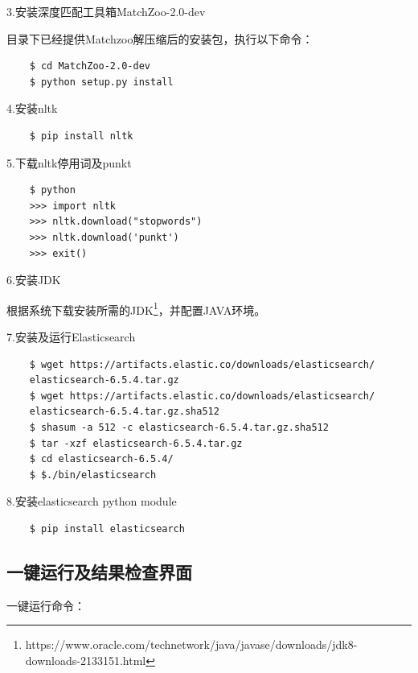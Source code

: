\documentclass[a4paper]{article}
\begin{document}
3.安装深度匹配工具箱MatchZoo-2.0-dev

目录下已经提供Matchzoo解压缩后的安装包，执行以下命令：
\begin{verbatim}
    $ cd MatchZoo-2.0-dev
    $ python setup.py install
\end{verbatim}

4.安装nltk
\begin{verbatim}
    $ pip install nltk
\end{verbatim}

5.下载nltk停用词及punkt
\begin{verbatim}
    $ python
    >>> import nltk
    >>> nltk.download("stopwords")
    >>> nltk.download('punkt')
    >>> exit()
\end{verbatim}

6.安装JDK

根据系统下载安装所需的JDK\footnote{https://www.oracle.com/technetwork/java/javase/downloads/jdk8-downloads-2133151.html}，并配置JAVA环境。

7.安装及运行Elasticsearch
\begin{verbatim}
    $ wget https://artifacts.elastic.co/downloads/elasticsearch/
    elasticsearch-6.5.4.tar.gz
    $ wget https://artifacts.elastic.co/downloads/elasticsearch/
    elasticsearch-6.5.4.tar.gz.sha512
    $ shasum -a 512 -c elasticsearch-6.5.4.tar.gz.sha512
    $ tar -xzf elasticsearch-6.5.4.tar.gz
    $ cd elasticsearch-6.5.4/
    $ $./bin/elasticsearch
\end{verbatim}

8.安装elasticsearch python module
\begin{verbatim}
    $ pip install elasticsearch
\end{verbatim}

\subsection{一键运行及结果检查界面}
一键运行命令：
\end{document}
